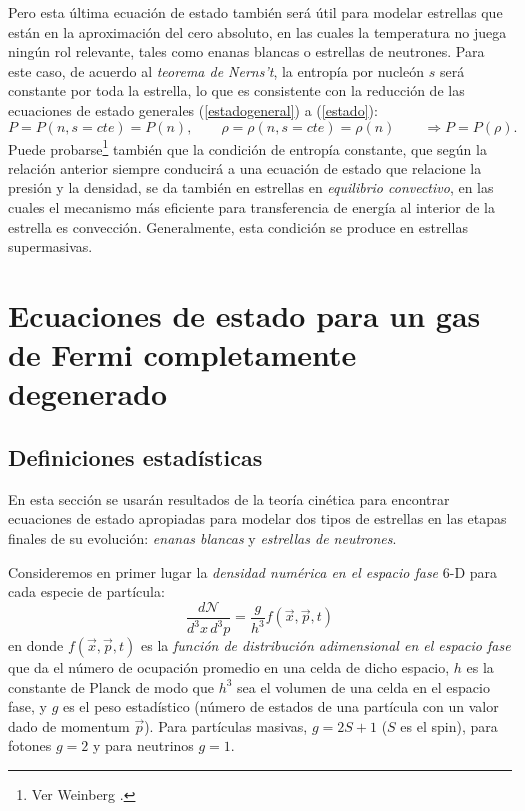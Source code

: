 Pero esta última ecuación de estado también será útil para modelar estrellas que están en la aproximación del cero absoluto, en las cuales la temperatura no juega ningún rol relevante, tales como enanas blancas o estrellas de neutrones. Para este caso, de acuerdo al \textit{teorema de Nerns't}, la entropía por nucleón $s$ será constante por toda la estrella, lo que es consistente con la reducción de las ecuaciones de estado generales (\ref{estadogeneral}) a (\ref{estado}):
\begin{equation}
 P=P(n,s=cte)=P(n),\qquad\rho=\rho(n,s=cte)=\rho(n)\qquad\Rightarrow P=P(\rho).
\end{equation}
Puede probarse\footnote{Ver Weinberg \cite{Weinberg72}.} también que la condición de entropía constante, que según la relación anterior siempre conducirá a una ecuación de estado que relacione la presión y la densidad, se da también en estrellas en \textit{equilibrio convectivo}, en las cuales el mecanismo más eficiente para transferencia de energía al interior de la estrella es convección. Generalmente, esta condición se produce en estrellas supermasivas.

\section[Ecuaciones de estado de Fermi]{Ecuaciones de estado para un gas de Fermi completamente degenerado}\label{sec:ecsdeestado}
\subsection{Definiciones estadísticas}
En esta sección se usarán resultados de la teoría cinética para encontrar ecuaciones de estado apropiadas para modelar dos tipos de estrellas en las etapas finales de su evolución: \textit{enanas blancas} y \textit{estrellas de neutrones}.

Consideremos en primer lugar la \textit{densidad numérica en el espacio fase} 6-D para cada especie de partícula:
\begin{equation}
 \frac{d\mathcal{N}}{d^3x\,d^3p}=\frac{g}{h^3}f(\vec{x},\vec{p},t)
\end{equation}
en donde $f(\vec{x},\vec{p},t)$ es la \textit{función de distribución adimensional en el espacio fase} que da el número de ocupación promedio en una celda de dicho espacio, $h$ es la constante de Planck de modo que $h^3$ sea el volumen de una celda en el espacio fase, y $g$ es el peso estadístico  (número de estados de una partícula con un valor dado de momentum $\vec{p}$). Para partículas masivas, $g=2S+1$ ($S$ es el spin), para fotones $g=2$ y para neutrinos $g=1$.

